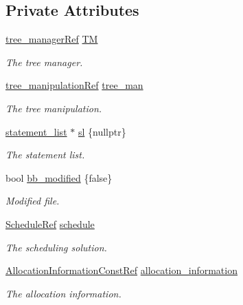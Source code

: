 \subsection*{Private Attributes}
\begin{DoxyCompactItemize}
\item 
\hyperlink{tree__manager_8hpp_a96ff150c071ce11a9a7a1e40590f205e}{tree\+\_\+manager\+Ref} \hyperlink{classMultipleEntryIfReduction_a485962c1f8aee78773d20954797d48dc}{TM}
\begin{DoxyCompactList}\small\item\em The tree manager. \end{DoxyCompactList}\item 
\hyperlink{tree__manipulation_8hpp_a1a9460e3a2f9fc6a96cfd2f24cc9b2a5}{tree\+\_\+manipulation\+Ref} \hyperlink{classMultipleEntryIfReduction_ac438476de6947084100c78d2a93b9d72}{tree\+\_\+man}
\begin{DoxyCompactList}\small\item\em The tree manipulation. \end{DoxyCompactList}\item 
\hyperlink{structstatement__list}{statement\+\_\+list} $\ast$ \hyperlink{classMultipleEntryIfReduction_af832434eeeac8bd15d9addb18c3207a0}{sl} \{nullptr\}
\begin{DoxyCompactList}\small\item\em The statement list. \end{DoxyCompactList}\item 
bool \hyperlink{classMultipleEntryIfReduction_abdf63137a4075f1ddfb9fd6897330930}{bb\+\_\+modified} \{false\}
\begin{DoxyCompactList}\small\item\em Modified file. \end{DoxyCompactList}\item 
\hyperlink{schedule_8hpp_af67f402958b3b52a1ec5cc4ce08ae3b9}{Schedule\+Ref} \hyperlink{classMultipleEntryIfReduction_a51863fa75a5407620503b3c0adaf9958}{schedule}
\begin{DoxyCompactList}\small\item\em The scheduling solution. \end{DoxyCompactList}\item 
\hyperlink{allocation__information_8hpp_a54287618a63bf87e31ddb17ba01e7ca7}{Allocation\+Information\+Const\+Ref} \hyperlink{classMultipleEntryIfReduction_a2412aea74a8efc60dfe1516f6659bbed}{allocation\+\_\+information}
\begin{DoxyCompactList}\small\item\em The allocation information. \end{DoxyCompactList}\end{DoxyCompactItemize}
